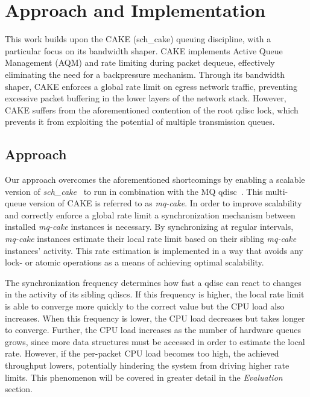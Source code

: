 \section{Approach and Implementation}
This work builds upon the CAKE (sch\_cake) queuing discipline, with a particular focus on its bandwidth shaper. CAKE implements Active Queue Management (AQM) and rate limiting during packet dequeue, effectively eliminating the need for a backpressure mechanism. Through its bandwidth shaper, CAKE enforces a global rate limit on egress network traffic, preventing excessive packet buffering in the lower layers of the network stack. However, CAKE suffers from the aforementioned contention of the root qdisc lock, which prevents it from exploiting the potential of multiple transmission queues.

\subsection{Approach}
Our approach overcomes the aforementioned shortcomings by enabling a scalable version of \textit{sch\_cake}~\cite{cake} to run in combination with the MQ qdisc~\cite{mq}.
%
This multi-queue version of CAKE is referred to as \textit{mq-cake}.
In order to improve scalability and correctly enforce a global rate limit a synchronization mechanism between installed \textit{mq-cake} instances is necessary.
%
By synchronizing at regular intervals, \textit{mq-cake} instances estimate their local rate limit based on their sibling \textit{mq-cake} instances' activity.  
%
This rate estimation is implemented in a way that avoids any lock- or atomic operations as a means of achieving optimal scalability.
%

The synchronization frequency determines how fast a qdisc can react to changes in the activity of its sibling qdiscs.
If this frequency is higher, the local rate limit is able to converge more quickly to the correct value but the CPU load also increases.
When this frequency is lower, the CPU load decreases but takes longer to converge.
%
Further, the CPU load increases as the number of hardware queues grows, since more data structures must be accessed in order to estimate the local rate.
%
However, if the per-packet CPU load becomes too high, the achieved throughput lowers, potentially hindering the system from driving higher rate limits.
This phenomenon will be covered in greater detail in the \textit{Evaluation} section.

